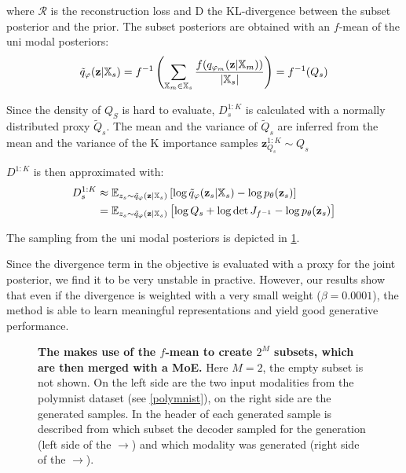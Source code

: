where $\mathcal{R}$ is the reconstruction loss and D the KL-divergence between the subset posterior and the prior.
The subset posteriors are obtained with an $f$-mean of the uni modal posteriors:
\begin{equation}
    \tilde{q}_{\varphi}(\textbf{z}|\mathbb{X}_s) = f^{-1}\left(\sum _{\mathbb{X}_m \in \mathbb{X}_s} \frac{f(q_{\varphi_m}(\textbf{z}|\mathbb{X}_m))}{|\mathbb{X}_s|}\right) = f^{-1}(Q_s)
\end{equation}

Since the density of $Q_S$ is hard to evaluate, $D^{1:K}_s$ is calculated with a normally distributed proxy $\tilde{Q}_s$.
The mean and the variance of $\tilde{Q}_s$ are inferred from the mean and the variance of the K importance samples $\textbf{z}_{Q_s}^{1:K} \sim Q_s$

$D^{1:K}$ is then approximated with:
\begin{equation}
    \begin{split}
        D^{1:K}_s &\approx \mathbb{E}_{z_s \sim \tilde{q}_{\varphi}(\textbf{z}|\mathbb{X}_s)} \left[ \log \tilde{q}_{\varphi}(\textbf{z} _s|\mathbb{X}_s) - \log p_{\theta}(\textbf{z} _s) \right]\\
        &=\mathbb{E}_{z_s \sim \tilde{q}_{\varphi}(\textbf{z}|\mathbb{X}_s)} \left[ \log Q_s + \log \det J_{f^{-1}} - \log p_{\theta}(\textbf{z} _s) \right]\\
    \end{split}
\end{equation}

The sampling from the uni modal posteriors is depicted in \cref{iwmogfmGraph}.

\smallskip

Since the divergence term in the objective is evaluated with a proxy for the joint posterior, we find it to be very unstable in practive.
However, our results show that even if the divergence is weighted with a very small weight ($\beta = 0.0001$), the  method is able to learn meaningful representations and yield good generative performance.

\begin{figure}[h!]
    \centering
    \caption{\textbf{The  makes use of the $f$-mean to create $2^M$ subsets, which are then merged with a MoE.} Here $M=2$, the empty subset is not shown. On the left side are the two input modalities from the polymnist dataset (see \cref{polymnist}), on the right side are the generated samples. In the header of each generated sample is described from which subset the decoder sampled for the generation (left side of the $\rightarrow$) and which modality was generated (right side of the $\rightarrow$).}
    \label{iwmogfmGraph}
\end{figure}



